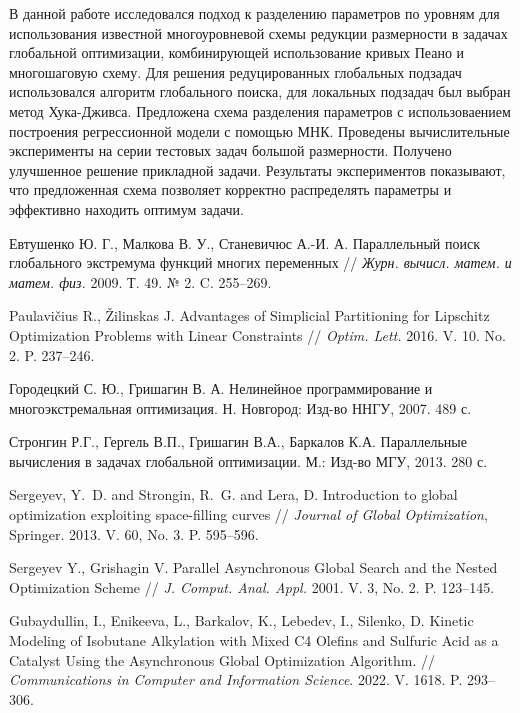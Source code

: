 \documentclass[11pt, oneside, a4paper]{article}
\begin{document}
В данной работе исследовался подход к разделению параметров по уровням для использования известной многоуровневой схемы редукции размерности в задачах глобальной оптимизации, комбинирующей использование кривых Пеано и многошаговую схему. Для решения редуцированных глобальных подзадач использовался алгоритм глобального поиска, для локальных подзадач был выбран метод Хука-Дживса. Предложена схема разделения параметров с использоваением построения регрессионной модели с помощью МНК. Проведены вычислительные эксперименты на серии тестовых задач большой размерности. Получено улучшенное решение прикладной задачи. Результаты экспериментов показывают, что предложенная схема позволяет корректно распределять параметры и эффективно находить оптимум задачи.

\begin{biblio}

 Евтушенко Ю. Г., Малкова В. У., Станевичюс А.-И. А. Параллельный поиск глобального экстремума функций многих переменных // {\it Журн. вычисл. матем. и матем. физ.} 2009. Т. 49. № 2. C. 255--269.

 Paulavi{\v c}ius R., {\v Z}ilinskas J. Advantages of Simplicial Partitioning for Lipschitz Optimization Problems with Linear Constraints // {\it Optim. Lett.} 2016. V. 10. No. 2. P. 237--246.

 Городецкий С. Ю., Гришагин В. А. Нелинейное программирование и многоэкстремальная оптимизация. Н. Новгород: Изд-во ННГУ, 2007. 489 с.

 Стронгин Р.Г., Гергель В.П., Гришагин В.А., Баркалов К.А. Параллельные вычисления в задачах глобальной оптимизации. М.: Изд-во МГУ, 2013. 280 с.

 Sergeyev, Y.~D. and Strongin, R.~G. and Lera, D. Introduction to global optimization exploiting space-filling curves // {\it Journal of Global Optimization}, Springer. 2013. V. 60, No. 3. P. 595--596.

 Sergeyev Y., Grishagin V. Parallel Asynchronous Global Search and the Nested Optimization Scheme //  {\it J. Comput. Anal. Appl.} 2001. V. 3, No. 2. P. 123--145.

 Gubaydullin, I., Enikeeva, L., Barkalov, K., Lebedev, I., Silenko, D. Kinetic Modeling of Isobutane Alkylation with Mixed C4 Olefins and Sulfuric Acid as a Catalyst Using the Asynchronous Global Optimization Algorithm. // {\it Communications in Computer and Information Science}. 2022. V. 1618.  P. 293--306. 



\end{biblio}
\end{document}
